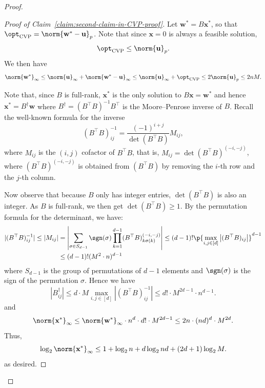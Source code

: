 \documentclass[11pt,a4paper]{article}
\begin{document}
\begin{proof}
\begin{proof}[Proof of Claim~\ref{claim:second-claim-in-CVP-proof}]
            Let $\mathbf{w}^* = B \mathbf{x}^*$, so that \(
                \opt_{\text{CVP}} = \norm{\mathbf{w}^* - \mathbf{u}}_p\). Note that since $\mathbf{x} = 0$ is always a feasible solution,
            \begin{equation}\label{eq:bound-on-opt-CVP}
                \opt_{\text{CVP}} \leq \norm{\mathbf{u}}_p.
            \end{equation}
            We then have
            \[
                \norm{\mathbf{w}^*}_\infty \leq \norm{\mathbf{u}}_\infty + \norm{\mathbf{w}^* -\mathbf{u}}_\infty \leq \norm{\mathbf{u}}_\infty + \opt_{\text{CVP}}\leq 2\norm{\mathbf{u}}_p  \leq 2{n}M.
            \]
            
            Note that, since $B$ is full-rank, $\mathbf{x}^*$ is the only solution to $B\mathbf{x} = \mathbf{w}^*$ and hence $\mathbf{x}^* = B^{\dagger} \mathbf{w}$ where $B^\dagger = (B^{\top}B)^{-1} B^{\top}$ is the Moore–Penrose inverse of $B$. Recall the well-known formula for the inverse
            \begin{equation}
                (B^{\top}B)^{-1}_{ij} = \frac{(-1)^{i+j}}{\operatorname{det}(B^{\top}B)} M_{ij},
            \end{equation}
            where $M_{ij}$ is the $(i,j)$ cofactor of $B^{\top}B$, that is, $M_{ij} = \operatorname{det}(B^\top B)^{(-i,-j)}$, where $(B^\top B)^{(-i,-j)}$ is obtained from $(B^\top B)$ by removing the $i$-{th} row and the $j$-{th} column. 
            
            Now observe that because \(B\) only has integer entries, \(\det(B^\top B)\) is also an integer. As \(B\) is full-rank, we then get \(\det(B^\top B) \ge 1\). By the permutation formula for the determinant, we have:
            \begin{align*}
               |(B^\top B)^{-1}_{ij}| \leq |M_{ij}| &= \left|\sum_{\sigma \in S_{d-1}} \sgn(\sigma) \prod_{k=1}^{d-1} (B^\top B)_{k\sigma(k)}^{(-i,-j)}\right|\leq (d-1)! \p{\max_{i,j\in [d]} \left|(B^\top B)_{ij}\right|}^{d-1} \\
               &\leq (d-1)! (M^2 \cdot n)^{d-1}
            \end{align*}
            where $S_{d-1}$ is the group of permutations of $d-1$ elements and $\sgn(\sigma)$ is the sign of the permutation $\sigma$. 
            Hence we have
            \begin{equation}
               |B^\dagger_{ij}| \leq d \cdot M \max_{i,j\in[d]} |(B^\top B)^{-1}_{ij}| \leq d!\cdot M^{2d-1} \cdot n^{d-1}.
            \end{equation}
            and
            \begin{equation}
                \norm{\mathbf{x}^*}_\infty \leq \norm{\mathbf{w}^*}_{\infty} \cdot n^d \cdot d!\cdot M^{2d-1}  \leq 2n \cdot (nd)^d \cdot M^{2d}.
            \end{equation}
            Thus,
            \[
                \log_2 \norm{\mathbf{x}^*}_\infty \leq 1 + \log_2 n + d\log_2 nd + (2d+1)\log_2 M.
            \]
            as desired.


\end{proof}
\end{proof}
\end{document}
